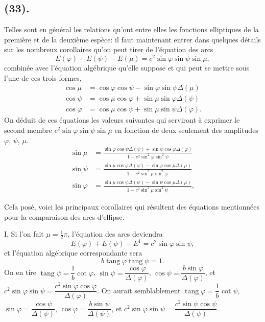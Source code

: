 \documentclass{article}
\begin{document}
\subsection*{(33).}

Telles sont en général les relations qu'ont entre elles les fonctions elliptiques de la première et de la deuxième espèce: il faut maintenant entrer dans quelques détails sur les nombreux corollaires qu'on peut tirer de l'équation des arcs
\[ E(\varphi)+E(\psi)-E(\mu)=c^{2}\sin\varphi\sin\psi\sin\mu, \]
combinée avec l'équation algébrique qu'elle suppose et qui peut se mettre sous l'une de ces trois formes,
\[ \begin{aligned} \cos\mu &= \cos\varphi\cos\psi-\sin\varphi\sin\psi\Delta(\mu) \\ \cos\psi &= \cos\mu\cos\varphi+\sin\mu\sin\varphi\Delta(\psi) \\ \cos\varphi &= \cos\mu\cos\psi+\sin\mu\sin\psi\Delta(\varphi). \end{aligned} \]
On déduit de ces équations les valeurs suivantes qui serviront à exprimer le second membre $c^{2}\sin\varphi\sin\psi\sin\mu$ en fonction de deux seulement des amplitudes $\varphi$, $\psi$, $\mu$.
\[ \begin{aligned} \sin\mu &= \frac{\sin\varphi\cos\psi\Delta(\psi)+\sin\psi\cos\varphi\Delta(\varphi)}{1-c^{2}\sin^{2}\varphi\sin^{2}\psi} \\ \sin\psi &= \frac{\sin\mu\cos\varphi\Delta(\varphi)-\sin\varphi\cos\mu\Delta(\mu)}{1-c^{2}\sin^{2}\mu\sin^{2}\varphi} \\ \sin\varphi &= \frac{\sin\mu\cos\psi\Delta(\psi)-\sin\psi\cos\mu\Delta(\mu)}{1-c^{2}\sin^{2}\mu\sin^{2}\psi}, \end{aligned} \]


Cela posé, voici les principaux corollaires qui résultent des équations mentionnées pour la comparaison des arcs d'ellipse.

I. Si l'on fait $\mu=\frac{1}{2}\pi$, l'équation des arcs deviendra
\[ E(\varphi)+E(\psi)-E^{1}=c^{2}\sin\varphi\sin\psi, \]
et l'équation algébrique correspondante sera
\[ b\operatorname{tang}\varphi\operatorname{tang}\psi=1. \]
On en tire $\operatorname{tang}\psi=\dfrac{1}{b}\cot\varphi$, $\sin\psi=\dfrac{\cos\varphi}{\Delta(\varphi)}$, $\cos\psi=\dfrac{b\sin\varphi}{\Delta(\varphi)}$, et $c^{2}\sin\varphi\sin\psi=\dfrac{c^{2}\sin\varphi\cos\varphi}{\Delta(\varphi)}$. On aurait semblablement $\operatorname{tang}\varphi=\dfrac{1}{b}\cot\psi$, $\sin\varphi=\dfrac{\cos\psi}{\Delta(\psi)}$, $\cos\varphi=\dfrac{b\sin\psi}{\Delta(\psi)}$, et $c^{2}\sin\varphi\sin\psi=\dfrac{c^{2}\sin\psi\cos\psi}{\Delta(\psi)}$.
\end{document}
